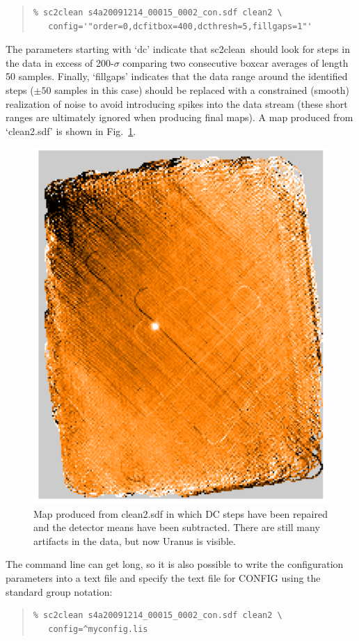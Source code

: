 \documentclass[twoside,11pt]{article}
\newenvironment{myquote}{\begin{quote}\begin{small}}{\end{small}\end{quote}}
\newcommand{\task}[1]{\textsf{#1}}
\newcommand{\clean}{\xref{\task{sc2clean}}{sun258}{SC2CLEAN}}
\newcommand{\xref}[3]{#1}
\renewcommand{\_}{\texttt{\symbol{95}}}
\begin{document}
\begin{myquote}
\begin{verbatim}
% sc2clean s4a20091214_00015_0002_con.sdf clean2 \
   config='"order=0,dcfitbox=400,dcthresh=5,fillgaps=1"'
\end{verbatim}
\end{myquote}

The parameters starting with `dc' indicate that \clean\ should look
for steps in the data in excess of 200-$\sigma$ comparing two
consecutive boxcar averages of length 50 samples.  Finally,
`fillgaps' indicates that the data range around the identified steps
($\pm 50$ samples in this case) should be replaced with a constrained
(smooth) realization of noise to avoid introducing spikes into the
data stream (these short ranges are ultimately ignored when producing
final maps). A map produced from `clean2.sdf' is shown in
Fig.~\ref{fig:map_dc_mean}.

\begin{figure}
\begin{center}
\includegraphics[width=0.5\linewidth]{sc19_map_mean_dc}
\caption{Map produced from clean2.sdf in which DC steps have been
  repaired and the detector means have been subtracted. There are
  still many artifacts in the data, but now Uranus is visible.}
\label{fig:map_dc_mean}
\end{center}
\end{figure}

The command line can get long, so it is also possible to write the
configuration parameters into a text file and specify the text file
for CONFIG using the standard group notation:

\begin{myquote}
\begin{verbatim}
% sc2clean s4a20091214_00015_0002_con.sdf clean2 \
   config=^myconfig.lis
\end{verbatim}
\end{myquote}
\end{document}
